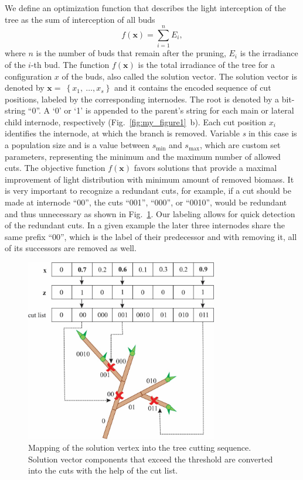 \documentclass[1p]{elsarticle}
\begin{document}
We define an optimization function that describes the light interception
of the tree as the sum of interception of all buds
\begin{equation}
   f\left( \mathbf{x} \right) = \sum_{i = 1}^{n}E_{i},
\end{equation}
where $n$ is the number of buds that remain after the pruning,
$E_{i}$ is the irradiance of the \(i\)-th bud. The function $f(\mathbf{x})$ is the total irradiance of the tree for a configuration \(x\) of the buds,
also called the solution vector. The solution vector is denoted by
\(\mathbf{x} = \ \left\{ x_{1},\ \ldots,x_{s} \right\}\) and it contains
the encoded sequence of cut positions, labeled by the corresponding
internodes. The root is denoted by a bit-string ``0''. A `0' or `1' is
appended to the parent's string for each main or lateral child
internode, respectively (Fig.~\ref{fig:my_figure1}~b). Each cut position \(x_{i}\)
identifies the internode, at which the branch is removed. Variable
\emph{s} in this case is a population size and is a value between
\(s_{\mathrm{\min}}\) and \(s_{\mathrm{\max}}\), which are custom set
parameters, representing the minimum and the maximum number of allowed
cuts. The objective function \(f(\mathbf{x})\) favors solutions that
provide a maximal improvement of light distribution with minimum amount
of removed biomass. It is very important to recognize a redundant cuts,
for example, if a cut should be made at internode ``00'', the cuts
``001'', ``000'', or ``0010'', would be redundant and thus unnecessary
as shown in Fig.~\ref{fig:my_figure2}. Our labeling allows for quick detection of the
redundant cuts. In a given example the later three internodes share the
same prefix ``00'', which is the label of their predecessor and with
removing it, all of its successors are removed as well.

\begin{figure}[hbt]
    \centering
    \includegraphics[width=3.3in]{figs/image2.jpeg}
    \caption{Mapping of the solution vertex into the tree cutting
sequence. Solution vector components that exceed the threshold are
converted into the cuts with the help of the cut list.}
    \label{fig:my_figure2}
\end{figure}
\end{document}
